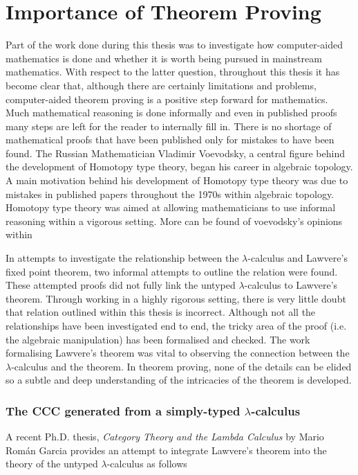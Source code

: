 \section{Importance of Theorem Proving}
Part of the  work done during this thesis was to investigate how computer-aided
mathematics is done and whether it is worth being pursued in mainstream
mathematics. With respect to the latter question, throughout this thesis it has
become clear that, although there are certainly limitations and problems,
computer-aided theorem proving is a positive step forward for mathematics. Much
mathematical reasoning is done informally and even in published proofs many
steps are left for the reader to internally fill in. There is no shortage of
mathematical proofs that have been published only for mistakes to have been
found. The Russian Mathematician Vladimir Voevodsky, a central figure behind the
development of Homotopy type theory, began his career in algebraic topology. A
main motivation behind his development of Homotopy type theory was due to
mistakes in published papers throughout the 1970s within algebraic topology.
Homotopy type theory was aimed at allowing mathematicians to use informal
reasoning within a vigorous setting. More can be found of voevodsky's opinions
within 

In attempts to investigate the relationship between the $\lambda$-calculus and
Lawvere's fixed point theorem, two informal attempts to outline the relation
were found. These attempted proofs did not fully link the untyped
$\lambda$-calculus to Lawvere's theorem. Through working in a highly rigorous
setting, there is very little doubt that relation outlined within this thesis is
incorrect. Although not all the relationships have been investigated end to end,
the tricky area of the proof (i.e. the algebraic manipulation) has been
formalised and checked. The work formalising Lawvere's theorem was vital to
observing the connection between the $\lambda$-calculus and the theorem. In
theorem proving, none of the details can be elided so a subtle and deep
understanding of the intricacies of the theorem is developed.

\subsubsection{The CCC generated from a simply-typed $\lambda$-calculus}

A recent Ph.D. thesis, \textit{Category Theory and the Lambda Calculus} by Mario
Rom\'an Garcia provides an attempt to integrate Lawvere's theorem into the
theory of the untyped $\lambda$-calculus as follows

